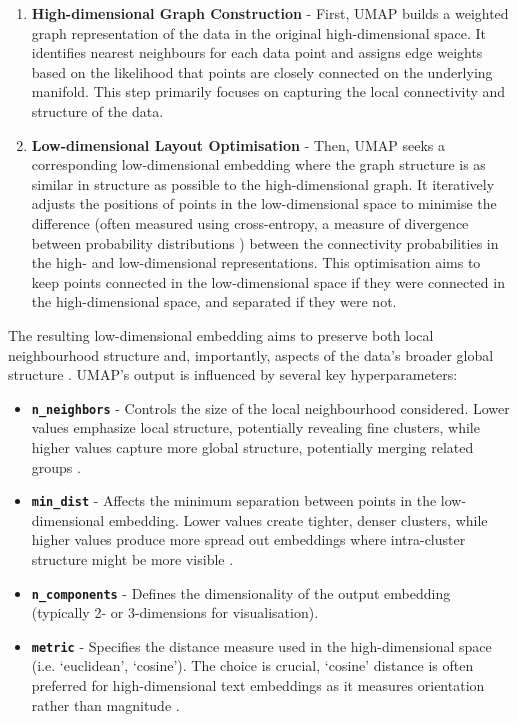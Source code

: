 \documentclass[10pt,oneside]{report}
\begin{document}
\begin{enumerate}
    \item \textbf{High-dimensional Graph Construction} - First, UMAP builds a weighted graph representation of the data in the original high-dimensional space. It identifies nearest neighbours for each data point and assigns edge weights based on the likelihood that points are closely connected on the underlying manifold. This step primarily focuses on capturing the local connectivity and structure of the data.
    \item \textbf{Low-dimensional Layout Optimisation} - Then, UMAP seeks a corresponding low-dimensional embedding where the graph structure is as similar in structure as possible to the high-dimensional graph. It iteratively adjusts the positions of points in the low-dimensional space to minimise the difference (often measured using cross-entropy, a measure of divergence between probability distributions \cite{zhang2018generalized}) between the connectivity probabilities in the high- and low-dimensional representations. This optimisation aims to keep points connected in the low-dimensional space if they were connected in the high-dimensional space, and separated if they were not.
\end{enumerate}

The resulting low-dimensional embedding aims to preserve both local neighbourhood structure and, importantly, aspects of the data's broader global structure \cite{mcinnes2018umap}. UMAP's output is influenced by several key hyperparameters:
\begin{itemize}
    \item \textbf{\texttt{n\_neighbors}} - Controls the size of the local neighbourhood considered. Lower values emphasize local structure, potentially revealing fine clusters, while higher values capture more global structure, potentially merging related groups \cite{mcinnes2018umap}.
    \item \textbf{\texttt{min\_dist}} - Affects the minimum separation between points in the low-dimensional embedding. Lower values create tighter, denser clusters, while higher values produce more spread out embeddings where intra-cluster structure might be more visible \cite{mcinnes2018umap}.
    \item \textbf{\texttt{n\_components}} - Defines the dimensionality of the output embedding (typically 2- or 3-dimensions for visualisation).
    \item \textbf{\texttt{metric}} - Specifies the distance measure used in the high-dimensional space (i.e. `euclidean', `cosine'). The choice is crucial, `cosine' distance is often preferred for high-dimensional text embeddings as it measures orientation rather than magnitude \cite{mcinnes2018umap}.
\end{itemize}
\end{document}
